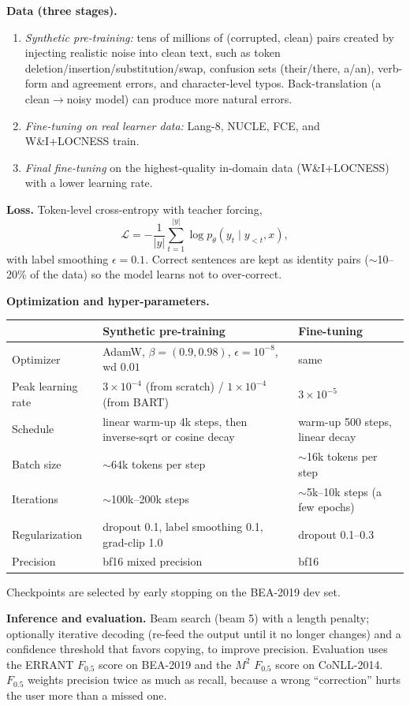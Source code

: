\documentclass[11pt]{article}
\begin{document}
\textbf{Data (three stages).}
\begin{enumerate}[leftmargin=1.5em]
\item \emph{Synthetic pre-training:} tens of millions of (corrupted, clean) pairs created by injecting realistic noise into clean text, such as token deletion/insertion/substitution/swap, confusion sets (their/there, a/an), verb-form and agreement errors, and character-level typos. Back-translation (a clean$\to$noisy model) can produce more natural errors.
\item \emph{Fine-tuning on real learner data:} Lang-8, NUCLE, FCE, and W\&I+LOCNESS train.
\item \emph{Final fine-tuning} on the highest-quality in-domain data (W\&I+LOCNESS) with a lower learning rate.
\end{enumerate}

\textbf{Loss.} Token-level cross-entropy with teacher forcing,
\[
\mathcal{L}=-\frac{1}{|y|}\sum_{t=1}^{|y|}\log p_\theta(y_t\mid y_{<t},x),
\]
with label smoothing $\epsilon=0.1$. Correct sentences are kept as identity pairs ($\sim$10--20\% of the data) so the model learns not to over-correct.

\textbf{Optimization and hyper-parameters.}
\begin{center}
\begin{tabular}{@{}p{3.2cm}p{6.6cm}p{4.4cm}@{}}
\toprule
 & Synthetic pre-training & Fine-tuning \\
\midrule
Optimizer & AdamW, $\beta=(0.9,0.98)$, $\epsilon=10^{-8}$, wd $0.01$ & same \\
Peak learning rate & $3\times10^{-4}$ (from scratch) / $1\times10^{-4}$ (from BART) & $3\times10^{-5}$ \\
Schedule & linear warm-up 4k steps, then inverse-sqrt or cosine decay & warm-up 500 steps, linear decay \\
Batch size & $\sim$64k tokens per step & $\sim$16k tokens per step \\
Iterations & $\sim$100k--200k steps & $\sim$5k--10k steps (a few epochs) \\
Regularization & dropout 0.1, label smoothing 0.1, grad-clip 1.0 & dropout 0.1--0.3 \\
Precision & bf16 mixed precision & bf16 \\
\bottomrule
\end{tabular}
\end{center}
Checkpoints are selected by early stopping on the BEA-2019 dev set.

\textbf{Inference and evaluation.} Beam search (beam 5) with a length penalty; optionally iterative decoding (re-feed the output until it no longer changes) and a confidence threshold that favors copying, to improve precision. Evaluation uses the ERRANT $F_{0.5}$ score on BEA-2019 and the $M^2$ $F_{0.5}$ score on CoNLL-2014. $F_{0.5}$ weights precision twice as much as recall, because a wrong ``correction'' hurts the user more than a missed one.
\end{document}
